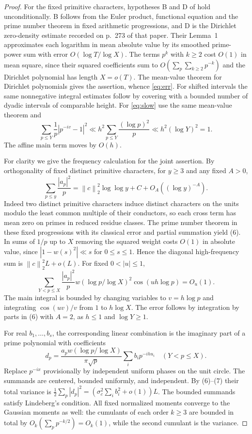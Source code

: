 \documentclass[11pt]{article}
\newcommand{\norm}[1]{\left\lVert #1\right\rVert}
\begin{document}
\begin{proof}
For the fixed primitive characters, hypotheses B and D of \cite{bp} hold unconditionally. B follows from the Euler product, functional equation and the prime number theorem in fixed arithmetic progressions, and D is the Dirichlet zero-density estimate recorded on p.~273 of that paper. Their Lemma~1 approximates each logarithm in mean absolute value by its smoothed prime-power sum with error $O(\log T/\log X)$. The terms $p^k$ with $k\ge2$ cost $O(1)$ in mean square, since their squared coefficients sum to $O(\sum_p\sum_{k\ge2}p^{-k})$ and the Dirichlet polynomial has length $X=o(T)$. The mean-value theorem for Dirichlet polynomials gives the assertion, whence \eqref{eq:err}. For shifted intervals the same nonnegative integral estimates follow by covering with a bounded number of dyadic intervals of comparable height. For \eqref{eq:slow} use the same mean-value theorem and
\[
 \sum_{p\le Y}\frac1p |p^{-iv}-1|^2
 \ll h^2\sum_{p\le Y}\frac{(\log p)^2}{p}\ll h^2(\log Y)^2=1.
\]
The affine main term moves by $O(h)$.

For clarity we give the frequency calculation for the joint assertion. By orthogonality of fixed distinct primitive characters, for $y\ge3$ and any fixed $A>0$,
\[
 \sum_{p\le y}\frac{|a_p|^2}{p}
 =\norm{c}_2^2\log\log y+C+O_A((\log y)^{-A}).                     \tag{6}
\]
Indeed two distinct primitive characters induce distinct characters on the units modulo the least common multiple of their conductors, so each cross term has mean zero on primes in reduced residue classes. The prime number theorem in these fixed progressions with its classical error and partial summation yield (6). In sums of $1/p$ up to $X$ removing the squared weight costs $O(1)$ in absolute value, since $|1-w(s)^2|\ll s$ for $0\le s\le1$. Hence the diagonal high-frequency sum is $\norm{c}_2^2L+o(L)$. For fixed $0<|u|\le1$,
\[
 \sum_{Y<p\le X}\frac{|a_p|^2}{p} w(\log p/\log X)^2
      \cos(uh\log p)=O_u(1).                                         \tag{7}
\]
The main integral is bounded by changing variables to $v=h\log p$ and integrating $\cos(uv)/v$ from $1$ to $h\log X$. The error follows by integration by parts in (6) with $A=2$, as $h\le1$ and $\log Y\ge1$.

For real $b_1,\ldots,b_s$, the corresponding linear combination is the imaginary part of a prime polynomial with coefficients
\[
 d_p=\frac{a_pw(\log p/\log X)}{\pi\sqrt p}\sum_i b_i p^{-ihu_i}
 \quad(Y<p\le X).
\]
Replace $p^{-ix}$ provisionally by independent uniform phases on the unit circle. The summands are centered, bounded uniformly, and independent. By (6)--(7) their total variance is
$\tfrac12\sum_p|d_p|^2=(\sigma_c^2\sum_i b_i^2+o(1))L$.
The bounded summands satisfy Lindeberg's condition. All fixed normalized moments converge to the Gaussian moments as well: the cumulants of each order $k\ge3$ are bounded in total by $O_k(\sum_p p^{-k/2})=O_k(1)$, while the second cumulant is the variance.


\end{proof}
\end{document}
